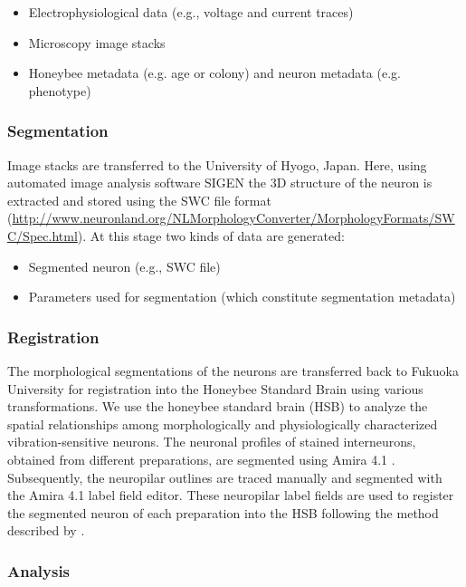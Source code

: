\documentclass{frontiersSCNS} %
\begin{document}
\begin{itemize}
\item Electrophysiological data (e.g., voltage and current traces)
\item Microscopy image stacks
\item Honeybee metadata (e.g. age or colony) and neuron metadata (e.g.
    phenotype)
\end{itemize}

\subsubsection{Segmentation}

Image stacks are transferred to the University of Hyogo, Japan. Here, using
automated image analysis software SIGEN \citep{Yamasaki2006, Minemoto} the 3D
structure of the neuron is extracted and stored using the SWC file format
(\url{http://www.neuronland.org/NLMorphologyConverter/MorphologyFormats/SWC/Spec.html}).
At this stage two kinds of data are generated:

\begin{itemize}
    \item Segmented neuron (e.g., SWC file)
\item Parameters used for segmentation (which constitute segmentation metadata)
\end{itemize}


\subsubsection{Registration}

The morphological segmentations of the neurons are transferred back to Fukuoka
University for registration into the Honeybee Standard Brain using various
transformations. We use the honeybee standard brain (HSB) to analyze the
spatial relationships among morphologically and physiologically characterized
vibration-sensitive neurons. The neuronal profiles of stained interneurons,
obtained from different preparations, are segmented  using Amira 4.1
\citep{Evers2005}. Subsequently, the neuropilar outlines are traced manually and
segmented with the Amira 4.1 label field editor. These neuropilar label fields
are used to register the segmented neuron of each preparation into the HSB
following the method described by \citet{Brandt2005}.


\subsubsection{Analysis}
\end{document}
